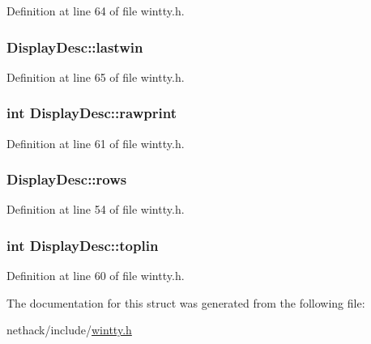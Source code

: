 Definition at line 64 of file wintty.\+h.

\hypertarget{structDisplayDesc_aacade99c7de23ebd3c3417024a005848}{
\subsubsection[{lastwin}]{ Display\+Desc\+::lastwin}}\label{structDisplayDesc_aacade99c7de23ebd3c3417024a005848}


Definition at line 65 of file wintty.\+h.

\hypertarget{structDisplayDesc_af4dc2f4161cf6554cc281ddc1d329025}{
\subsubsection[{rawprint}]{\setlength{\rightskip}{0pt plus 5cm}int Display\+Desc\+::rawprint}}\label{structDisplayDesc_af4dc2f4161cf6554cc281ddc1d329025}


Definition at line 61 of file wintty.\+h.

\hypertarget{structDisplayDesc_a55f38c5cab97073d98b99b816be778bf}{
\subsubsection[{rows}]{ Display\+Desc\+::rows}}\label{structDisplayDesc_a55f38c5cab97073d98b99b816be778bf}


Definition at line 54 of file wintty.\+h.

\hypertarget{structDisplayDesc_a42ca3d6db2bb7800d91936e30bdfacd7}{
\subsubsection[{toplin}]{\setlength{\rightskip}{0pt plus 5cm}int Display\+Desc\+::toplin}}\label{structDisplayDesc_a42ca3d6db2bb7800d91936e30bdfacd7}


Definition at line 60 of file wintty.\+h.



The documentation for this struct was generated from the following file\+:\begin{DoxyCompactItemize}
\item 
nethack/include/\hyperlink{wintty_8h}{wintty.\+h}\end{DoxyCompactItemize}
